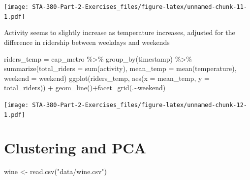 \documentclass[
]{article}
\newenvironment{Shaded}{\begin{snugshade}}{\end{snugshade}}
\newcommand{\AttributeTok}[1]{\textcolor[rgb]{0.77,0.63,0.00}{#1}}
\newcommand{\ConstantTok}[1]{\textcolor[rgb]{0.00,0.00,0.00}{#1}}
\newcommand{\DecValTok}[1]{\textcolor[rgb]{0.00,0.00,0.81}{#1}}
\newcommand{\FunctionTok}[1]{\textcolor[rgb]{0.00,0.00,0.00}{#1}}
\newcommand{\NormalTok}[1]{#1}
\newcommand{\OtherTok}[1]{\textcolor[rgb]{0.56,0.35,0.01}{#1}}
\newcommand{\SpecialCharTok}[1]{\textcolor[rgb]{0.00,0.00,0.00}{#1}}
\newcommand{\StringTok}[1]{\textcolor[rgb]{0.31,0.60,0.02}{#1}}
\begin{document}
\texttt{[image: STA-380-Part-2-Exercises\_files/figure-latex/unnamed-chunk-11-1.pdf]}

Activity seems to slightly increase as temperature increases, adjusted
for the difference in ridership between weekdays and weekends

\begin{Shaded}
\begin{Highlighting}[]
\NormalTok{riders\_temp }\OtherTok{=}\NormalTok{ cap\_metro }\SpecialCharTok{\%\textgreater{}\%}
  \FunctionTok{group\_by}\NormalTok{(timestamp) }\SpecialCharTok{\%\textgreater{}\%}
  \FunctionTok{summarize}\NormalTok{(}\AttributeTok{total\_riders =} \FunctionTok{sum}\NormalTok{(activity), }\AttributeTok{mean\_temp =} \FunctionTok{mean}\NormalTok{(temperature), }\AttributeTok{weekend =}\NormalTok{ weekend)}
\FunctionTok{ggplot}\NormalTok{(riders\_temp, }\FunctionTok{aes}\NormalTok{(}\AttributeTok{x =}\NormalTok{ mean\_temp, }\AttributeTok{y =}\NormalTok{ total\_riders)) }\SpecialCharTok{+} \FunctionTok{geom\_line}\NormalTok{()}\SpecialCharTok{+}\FunctionTok{facet\_grid}\NormalTok{(.}\SpecialCharTok{\textasciitilde{}}\NormalTok{weekend)}
\end{Highlighting}
\end{Shaded}

\texttt{[image: STA-380-Part-2-Exercises\_files/figure-latex/unnamed-chunk-12-1.pdf]}

\hypertarget{clustering-and-pca}{%
\section{Clustering and PCA}\label{clustering-and-pca}}

\begin{Shaded}
\begin{Highlighting}[]
\NormalTok{wine }\OtherTok{\textless{}{-}} \FunctionTok{read.csv}\NormalTok{(}\StringTok{"data/wine.csv"}\NormalTok{)}
\end{Highlighting}
\end{Shaded}

\begin{Shaded}
\end{Shaded}
\end{document}
